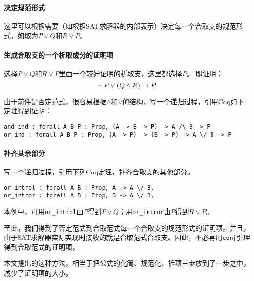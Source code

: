 \paragraph{决定规范形式}
这里可以根据需要（如根据SAT求解器的内部表示）决定每一个合取支的规范形式，如取为$P \lor Q$和$R \lor P$。

\paragraph{生成合取支的一个析取成分的证明项}
选择$P \lor Q$和$R \lor P$里面一个较好证明的析取支，这里都选择$P$。
即证明：
$$ \vdash P \lor (Q \land R) \rightarrow P $$

由于前件是否定范式，很容易根据$\land$和$\lor$的结构，写一个递归过程，引用Coq如下定理得到证明：
\begin{verbatim}
and_ind : forall A B P : Prop, (A -> B -> P) -> A /\ B -> P.
or_ind : forall A B P : Prop, (A -> P) -> (B -> P) -> A \/ B -> P.
\end{verbatim}

\paragraph{补齐其余部分}
写一个递归过程，引用下列Coq定理，补齐合取支的其他部分。
\begin{verbatim}
or_introl : forall A B : Prop, A -> A \/ B.
or_intror : forall A B : Prop, B -> A \/ B.
\end{verbatim}
本例中，可用\texttt{or\_introl}由$P$得到$P \lor Q$；用\texttt{or\_intror}由$P$得到$R \lor P$。

至此，我们得到了否定范式到合取范式每一个合取支的规范形式的证明项。并且，由于SAT求解器实际实现时接收的就是合取范式合取支。因此，不必再用\texttt{conj}引理得到合取范式的证明项。

本文提出的这种方法，相当于把公式的化简、规范化、拆项三步放到了一步之中，减少了证明项的大小。

